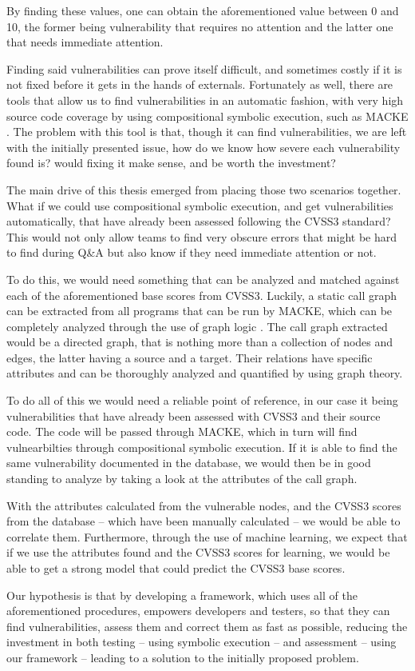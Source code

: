 By finding these values, one can obtain the aforementioned value between 0 and 10, the former being vulnerability that requires no attention and the latter one that needs immediate attention.

Finding said vulnerabilities can prove itself difficult, and sometimes costly if it is not fixed before it gets in the hands of externals. Fortunately as well, there are tools that allow us to find vulnerabilities in an automatic fashion, with very high source code coverage by using compositional symbolic execution, such as MACKE \parencite{ognawala}. The problem with this tool is that, though it can find vulnerabilities, we are left with the initially presented issue, how do we know how severe each vulnerability found is? would fixing it make sense, and be worth the investment?

The main drive of this thesis emerged from placing those two scenarios together. What if we could use compositional symbolic execution, and get vulnerabilities automatically, that have already been assessed following the CVSS3 standard? This would not only allow teams to find very obscure errors that might be hard to find during Q\&A but also know if they need immediate attention or not.

To do this, we would need something that can be analyzed and matched against each of the aforementioned base scores from CVSS3. Luckily, a static call graph can be extracted from all programs that can be run by MACKE, which can be completely analyzed through the use of graph logic \parencite{graphs}. The call graph extracted would be a directed graph, that is nothing more than a collection of nodes and edges, the latter having a source and a target. Their relations have specific attributes and can be thoroughly analyzed and quantified by using graph theory.

To do all of this we would need a reliable point of reference, in our case it being vulnerabilities that have already  been assessed with CVSS3 and their source code. The code will be passed through MACKE, which in turn will find vulnearbilties through compositional symbolic execution. If it is able to find the same vulnerability documented in the database, we would then be in good standing to analyze by taking a look at the attributes of the call graph. 

With the attributes calculated from the vulnerable nodes, and the CVSS3 scores from the database -- which have been manually calculated -- we would be able to correlate them. Furthermore, through the use of machine learning, we expect that if we use the attributes found and the CVSS3 scores for learning, we would be able to get a strong model that could predict the CVSS3 base scores.

Our hypothesis is that by developing a framework, which uses all of the aforementioned procedures, empowers developers and testers, so that they can find vulnerabilities, assess them and correct them as fast as possible, reducing the investment in both testing -- using symbolic execution -- and assessment -- using our framework -- leading to a solution to the initially proposed problem.